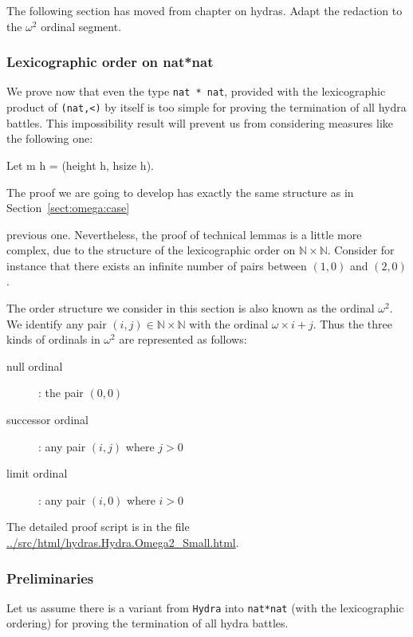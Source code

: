 \begin{todo}
The following section has moved from chapter on hydras.
Adapt the redaction to the $\omega^2$ ordinal segment.
\end{todo}


\subsubsection{Lexicographic order on \texorpdfstring{nat*nat}{nat*nat}}
\label{omega2-case}

We  prove now that even the type \texttt{nat * nat}, provided with the lexicographic product of \texttt{(nat,<)} by itself is too simple for proving the termination of all hydra battles. This impossibility result will prevent us from considering measures like the following one:


  \begin{Coqsrc}
  Let m h = (height h, hsize h).
  \end{Coqsrc}

The proof we are going to develop has exactly the same structure as in Section~\ref{sect:omega:case}


previous one. Nevertheless, the proof of technical  lemmas is a little more complex, due to 
 the structure of the lexicographic order on $\mathbb{N}\times\mathbb{N}$. 
Consider for instance that there exists an infinite number of pairs between
$(1,0)$ and $(2,0)$.


\begin{remark}
  The order structure we consider in this section is also known as the ordinal
  $\omega^2$. We identify any pair $(i,j)\in \mathbb{N}\times\mathbb{N}$ with the ordinal $\omega\times i + j$. Thus the three kinds of ordinals in $\omega^2$
  are represented as follows:
  \begin{description}
  \item[null ordinal] : the pair $(0,0)$
  \item[successor ordinal] : any pair $(i,j)$ where $j>0$
  \item[limit ordinal] : any pair $(i,0)$ where $i>0$
  \end{description}
\end{remark}

The detailed  proof script is in the file \url{../src/html/hydras.Hydra.Omega2_Small.html}.

\subsubsection{Preliminaries}
Let us assume there is a variant from \texttt{Hydra} into \texttt{nat*nat} (with the
   lexicographic ordering)  for proving the   termination of all hydra battles.

